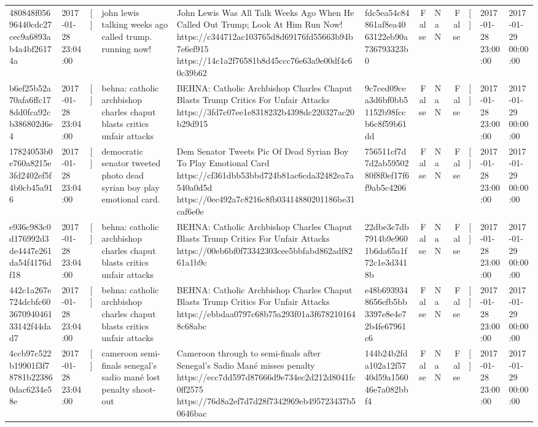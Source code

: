 \begin{tabular}{llllllrlrlll}
480848f05696440cdc27cec9a6893ab4a4bf26174a & 2017-01-28 23:04:00 & [] & john lewis talking weeks ago called trump. running now! & John Lewis Was All Talk Weeks Ago When He Called Out Trump; Look At Him Run Now! https://c344712ac103765d8d69176fd55663b94b7e6ef915 https://14c1a2f76581b8d45ccc76e63a9e00df4c60c39b62 & fdc5ea54c84861af8ea4063122eb90a736793323b0 & False & NaN & False & [] & 2017-01-28 23:00:00 & 2017-01-29 00:00:00 \\
b6ef25b52a70afa6ffc178dd0fca92cb386802d6e4 & 2017-01-28 23:04:00 & [] & behna: catholic archbishop charles chaput blasts critics unfair attacks & BEHNA: Catholic Archbishop Charles Chaput Blasts Trump Critics For Unfair Attacks https://3fd7c07ee1e8318232b4398dc220327ac20b29d915 & 9c7ced09cea3d6bf0bb51152b98fccb6c8f59b61dd & False & NaN & False & [] & 2017-01-28 23:00:00 & 2017-01-29 00:00:00 \\
17824053b0e760a8215e3fd2402ef5f4b0cb45a916 & 2017-01-28 23:04:00 & [] & democratic senator tweeted photo dead syrian boy play emotional card. & Dem Senator Tweets Pic Of Dead Syrian Boy To Play Emotional Card https://cf361dbb53bbd724b81ac6cda32482ea7a540a0d5d https://0ec492a7c8216c8fb03414880201186be31caf6e0e & 756511cf7d7d2ab5950280f8f0ef17f6f9ab5c4206 & False & NaN & False & [] & 2017-01-28 23:00:00 & 2017-01-29 00:00:00 \\
e936c983c0d176992d3de4447e261da54f4176df18 & 2017-01-28 23:04:00 & [] & behna: catholic archbishop charles chaput blasts critics unfair attacks & BEHNA: Catholic Archbishop Charles Chaput Blasts Trump Critics For Unfair Attacks https://00eb6bf0f73342303cee5bbfabd862adf8261a1b9c & 22dbe3c7db7914b9e9601b6da65a1f72c1e3d3418b & False & NaN & False & [] & 2017-01-28 23:00:00 & 2017-01-29 00:00:00 \\
442c1a267e724dcbfc60367094046133142f44dad7 & 2017-01-28 23:04:00 & [] & behna: catholic archbishop charles chaput blasts critics unfair attacks & BEHNA: Catholic Archbishop Charles Chaput Blasts Trump Critics For Unfair Attacks https://ebbdaa0797c68b75a293f01a3f6782101648c68abc & e48b6939348656efb5bb3397e8e4e72b4fe67961c6 & False & NaN & False & [] & 2017-01-28 23:00:00 & 2017-01-29 00:00:00 \\
4ccb97c522b19901f3f78781b223860dac6234e58e & 2017-01-28 23:04:00 & [] & cameroon semi-finals senegal's sadio mané lost penalty shoot-out & Cameroon through to semi-finals after Senegal’s Sadio Mané misses penalty https://ecc7dd597d87666d9e734ec2d212d8041fc0ff2575 https://76d8a2ef7d7d28f7342969eb495723437b50646bac & 144b24b2fda102a12f5740d59a156046e7a082bbf4 & False & NaN & False & [] & 2017-01-28 23:00:00 & 2017-01-29 00:00:00 \\

\end{tabular}
